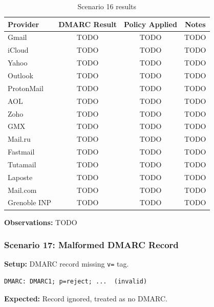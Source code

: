 \documentclass[11pt,a4paper]{article}
\begin{document}
\begin{table}[h]
\centering
\small
\begin{tabular}{lccc}
\toprule
\textbf{Provider} & \textbf{DMARC Result} & \textbf{Policy Applied} & \textbf{Notes} \\
\midrule
Gmail & TODO & TODO & TODO \\
iCloud & TODO & TODO & TODO \\
Yahoo & TODO & TODO & TODO \\
Outlook & TODO & TODO & TODO \\
ProtonMail & TODO & TODO & TODO \\
AOL & TODO & TODO & TODO \\
Zoho & TODO & TODO & TODO \\
GMX & TODO & TODO & TODO \\
Mail.ru & TODO & TODO & TODO \\
Fastmail & TODO & TODO & TODO \\
Tutamail & TODO & TODO & TODO \\
Laposte & TODO & TODO & TODO \\
Mail.com & TODO & TODO & TODO \\
Grenoble INP & TODO & TODO & TODO \\
\bottomrule
\end{tabular}
\caption{Scenario 16 results}
\end{table}

\textbf{Observations:} TODO


\subsubsection{Scenario 17: Malformed DMARC Record}

\textbf{Setup:} DMARC record missing \texttt{v=} tag.

\begin{lstlisting}
DMARC: DMARC1; p=reject; ...  (invalid)
\end{lstlisting}

\textbf{Expected:} Record ignored, treated as no DMARC.
\end{document}
